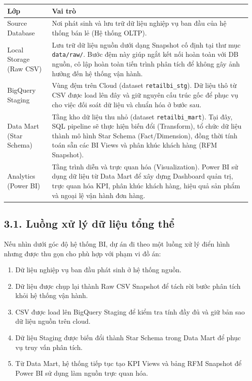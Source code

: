 \documentclass[12pt,a4paper]{article}
\newcommand{\code}[1]{\texttt{#1}}
\begin{document}
\begin{table}[H]
\centering
\begin{tabularx}{\textwidth}{|p{}|Y|}
\hline
\textbf{Lớp} & \textbf{Vai trò} \\
\hline
Source Database & Nơi phát sinh và lưu trữ dữ liệu nghiệp vụ ban đầu của hệ thống bán lẻ (Hệ thống OLTP). \\
\hline
Local Storage (Raw CSV) & Lưu trữ dữ liệu nguồn dưới dạng Snapshot cố định tại thư mục \code{data/raw/}. Bước đệm này giúp ngắt kết nối hoàn toàn với DB nguồn, cô lập hoàn toàn tiến trình phân tích để không gây ảnh hưởng đến hệ thống vận hành. \\
\hline
BigQuery Staging & Vùng đệm trên Cloud (dataset \code{retailbi\_stg}). Dữ liệu thô từ CSV được load lên đây và giữ nguyên cấu trúc gốc để phục vụ cho việc đối soát dữ liệu và chuẩn hóa ở bước sau. \\
\hline
Data Mart (Star Schema) & Tầng kho dữ liệu thu nhỏ (dataset \code{retailbi\_mart}). Tại đây, SQL pipeline sẽ thực hiện biến đổi (Transform), tổ chức dữ liệu thành mô hình Star Schema (Fact/Dimension), đồng thời tính toán sẵn các BI Views và phân khúc khách hàng (RFM Snapshot). \\
\hline
Analytics (Power BI) & Tầng trình diễn và trực quan hóa (Visualization). Power BI sử dụng dữ liệu từ Data Mart để xây dựng Dashboard quản trị, trực quan hóa KPI, phân khúc khách hàng, hiệu quả sản phẩm và ngoại lệ vận hành đơn hàng. \\
\hline
\end{tabularx}
\end{table}

\subsection{3.1. Luồng xử lý dữ liệu tổng thể}

Nếu nhìn dưới góc độ hệ thống BI, dự án đi theo một luồng xử lý điển hình nhưng được thu gọn cho phù hợp với phạm vi đồ án:

\begin{enumerate}
    \item Dữ liệu nghiệp vụ ban đầu phát sinh ở hệ thống nguồn.
    \item Dữ liệu được chụp lại thành Raw CSV Snapshot để tách rời bước phân tích khỏi hệ thống vận hành.
    \item CSV được load lên BigQuery Staging để kiểm tra tính đầy đủ và giữ bản sao dữ liệu nguồn trên cloud.
    \item Dữ liệu Staging được biến đổi thành Star Schema trong Data Mart để phục vụ truy vấn phân tích.
    \item Từ Data Mart, hệ thống tiếp tục tạo KPI Views và bảng RFM Snapshot để Power BI sử dụng làm nguồn trực quan hóa.
\end{enumerate}
\end{document}
